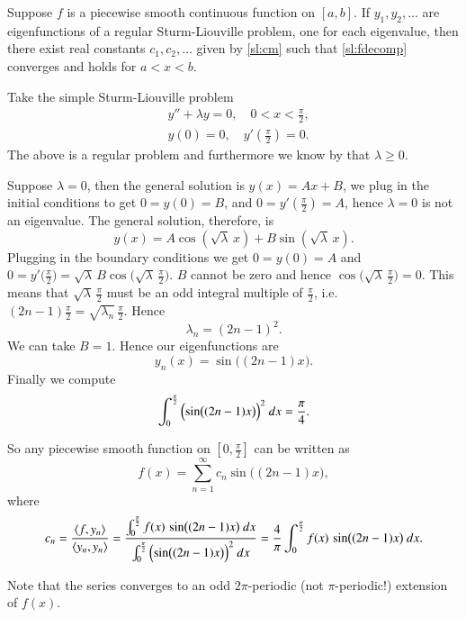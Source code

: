 \documentclass[12pt]{book}
\begin{document}
\begin{theorem}
Suppose $f$ is a piecewise smooth continuous function on $[a,b]$.  If $y_1,
y_2, \ldots$ are eigenfunctions of a regular Sturm-Liouville problem,
one for each eigenvalue,
then there exist real constants $c_1, c_2, \ldots$ given by \eqref{sl:cm}
such that
\eqref{sl:fdecomp} converges and holds for $a < x < b$.
\end{theorem}

\begin{example}
Take the simple Sturm-Liouville problem
\begin{align*}
& y'' + \lambda y = 0, \quad 0 < x < \frac{\pi}{2} , \\
& y(0) =0, \quad y'\left(\frac{\pi}{2}\right) = 0 .
\end{align*}
The above is a regular problem and furthermore we know by
that $\lambda \geq 0$.

Suppose $\lambda = 0$, then the general solution is $y(x) = Ax + B$,
we plug in the
initial conditions to get $0=y(0) = B$, and $0 = y'(\frac{\pi}{2}) = A$, hence
$\lambda = 0$ is not an eigenvalue.
The general solution, therefore, is
\begin{equation*}
y(x) = A \cos (\! \sqrt{\lambda} \, x ) + B \sin (\! \sqrt{\lambda} \, x) .
\end{equation*}
Plugging in the boundary conditions we get
$0 = y(0) = A$ and $0 = y'\bigl(\frac{\pi}{2}\bigr)
= \sqrt{\lambda} \, B \cos \bigl(\!\sqrt{\lambda} \, \frac{\pi}{2}\bigr)$.
$B$ cannot be zero and hence $\cos \bigl(\! \sqrt{\lambda} \,
\frac{\pi}{2}\bigr) = 0$.
This means that
$\sqrt{\lambda} \,\frac{\pi}{2}$ must be an odd integral multiple of
$\frac{\pi}{2}$,
i.e.\ $(2n-1)\frac{\pi}{2} = \sqrt{\lambda_n} \,\frac{\pi}{2}$.
Hence
\begin{equation*}
\lambda_n = {(2n-1)}^2 .
\end{equation*}
We can take $B = 1$.  Hence our eigenfunctions are
\begin{equation*}
y_n(x) = \sin \bigl( (2n-1)x \bigr) .
\end{equation*}
Finally we compute
\begin{equation*}
\int_0^{\frac{\pi}{2}} {\Bigl( \sin \bigl( (2n-1)x \bigr) \Bigr)}^2 ~ dx
= \frac{\pi}{4} .
\end{equation*}

So any piecewise smooth function on $[0,\frac{\pi}{2}]$ can be written as
\begin{equation*}
f(x) = \sum_{n=1}^\infty c_n \sin \bigl( (2n-1)x \bigr) ,
\end{equation*}
where
\begin{equation*}
c_n = \frac{\langle f , y_n \rangle}{\langle y_n , y_n \rangle}
= \frac{\int_0^{\frac{\pi}{2}} f(x) \, \sin \bigl( (2n-1)x \bigr) ~ dx
}{\int_0^{\frac{\pi}{2}} {\Bigl(\sin \bigl((2n-1)x\bigr)\Bigr)}^2 ~ dx}
= \frac{4}{\pi} \int_0^{\frac{\pi}{2}} f(x) \,\sin \bigl( (2n-1)x \bigr) ~ dx .
\end{equation*}

Note that the series converges to an odd $2\pi$-periodic (not
$\pi$-periodic!) extension of $f(x)$.
\end{example}
\end{document}
